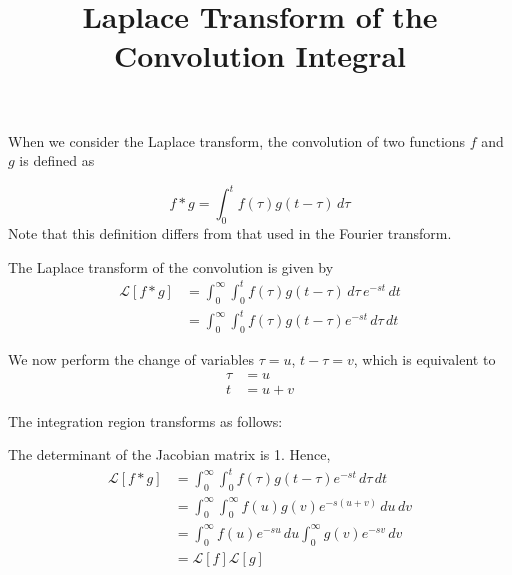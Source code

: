 \documentclass[letterpaper, 12pt]{article}
\title{Laplace Transform of the Convolution Integral}
\date{}
\theoremstyle{custom}
\begin{document}
\maketitle
When we consider the Laplace transform, the convolution of two functions $f$ and $g$ is defined as

\begin{equation*}
  f*g = \int_{0}^{t} f(\tau) g(t - \tau) \, d\tau
\end{equation*}
Note that this definition differs from that used in the Fourier transform.

The Laplace transform of the convolution is given by
\begin{align*}
  \mathcal{L} \left[ f*g \right] 
  &= \int_{0}^{\infty} \int_{0}^{t} f(\tau) g(t-\tau) \, d\tau \, e^{-st} \, dt \\
  &= \int_{0}^{\infty} \int_{0}^{t} f(\tau) g(t-\tau) e^{-st} \, d\tau  \, dt
\end{align*}

We now perform the change of variables $\tau = u$, $t - \tau = v$,
which is equivalent to
\begin{align*}
  \tau &= u \\
  t &= u + v
\end{align*}

The integration region transforms as follows:
\begin{center}
\end{center}

The determinant of the Jacobian matrix is 1.
Hence,
\begin{align*}
  \mathcal{L} \left[ f*g \right] 
  &= \int_{0}^{\infty} \int_{0}^{t} f(\tau) g(t-\tau) e^{-st} \, d\tau  \, dt \\
  &= \int_{0}^{\infty} \int_{0}^{\infty} f(u) g(v) e^{-s(u+v)} \, du  \, dv \\
  &= \int_{0}^{\infty} f(u) e^{-su} \, du \int_{0}^{\infty}  g(v) e^{-sv}  \, dv \\
  &= \mathcal{L} \left[ f \right] \mathcal{L} \left[ g \right] 
\end{align*}
\end{document}
